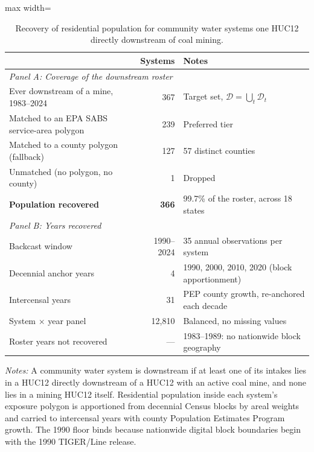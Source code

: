 \begin{table}[ht]
\centering
\caption{Recovery of residential population for community water systems one HUC12 directly downstream of coal mining.}
\label{tab:backcast_recovery}
\begin{adjustbox}{max width=\textwidth}
\begin{tabular}{lrl}
\toprule
& Systems & Notes \\
\midrule
\multicolumn{3}{l}{\textit{Panel A: Coverage of the downstream roster}} \\
Ever downstream of a mine, 1983--2024 & 367 & Target set, $\mathcal{D}=\bigcup_t \mathcal{D}_t$ \\
\quad Matched to an EPA SABS service-area polygon & 239 & Preferred tier \\
\quad Matched to a county polygon (fallback) & 127 & 57 distinct counties \\
\quad Unmatched (no polygon, no county) & 1 & Dropped \\
\textbf{Population recovered} & \textbf{366} & 99.7\% of the roster, across 18 states \\
\midrule
\multicolumn{3}{l}{\textit{Panel B: Years recovered}} \\
Backcast window & 1990--2024 & 35 annual observations per system \\
\quad Decennial anchor years & 4 & 1990, 2000, 2010, 2020 (block apportionment) \\
\quad Intercensal years & 31 & PEP county growth, re-anchored each decade \\
System $\times$ year panel & 12,810 & Balanced, no missing values \\
Roster years not recovered & --- & 1983--1989: no nationwide block geography \\
\bottomrule
\end{tabular}
\end{adjustbox}
\begin{minipage}{\textwidth}\footnotesize
\vspace{0.5em}
\textit{Notes:} A community water system is downstream if at least one of its intakes lies in a HUC12 directly downstream of a HUC12 with an active coal mine, and none lies in a mining HUC12 itself. Residential population inside each system's exposure polygon is apportioned from decennial Census blocks by areal weights and carried to intercensal years with county Population Estimates Program growth. The 1990 floor binds because nationwide digital block boundaries begin with the 1990 TIGER/Line release.
\end{minipage}
\end{table}
